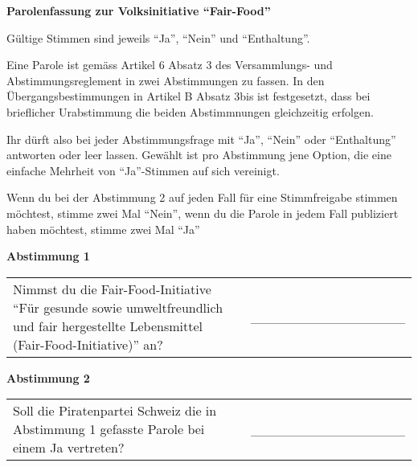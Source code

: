 \documentclass[11pt, a4paper]{scrartcl}
\begin{document}
{\begin{minipage}[t][12.5cm][t]{17.7cm}
\textbf{Parolenfassung zur Volksinitiative \enquote{Fair-Food}}

\vspace{0.2cm}
Gültige Stimmen sind jeweils \enquote{Ja}, \enquote{Nein} und \enquote{Enthaltung}.

\vspace{0.2cm}
Eine Parole ist gemäss Artikel 6 Absatz 3 des Versammlungs- und Abstimmungsreglement in zwei Abstimmungen zu fassen. In den Übergangsbestimmungen in Artikel B Absatz 3bis ist festgesetzt, dass bei brieflicher Urabstimmung die beiden Abstimmnungen gleichzeitig erfolgen.

\vspace{0.2cm}
Ihr dürft also bei jeder Abstimmungsfrage mit \enquote{Ja}, \enquote{Nein} oder \enquote{Enthaltung} antworten oder leer lassen. Gewählt ist pro Abstimmung jene Option, die eine einfache Mehrheit von \enquote{Ja}-Stimmen auf sich vereinigt. 

\vspace{0.2cm}
Wenn du bei der Abstimmung 2 auf jeden Fall für eine Stimmfreigabe stimmen möchtest, stimme zwei Mal \enquote{Nein}, wenn du die Parole in jedem Fall publiziert haben möchtest, stimme zwei Mal \enquote{Ja} %

\vspace{1cm}

\textbf{Abstimmung 1}

\vspace{0.5cm}

\begin{tabular}{ b{13.5cm} b{3cm} }
Nimmst du die Fair-Food-Initiative \enquote{Für gesunde sowie umweltfreundlich und fair hergestellte Lebensmittel (Fair-Food-Initiative)} an?
& \_\_\_\_\_\_\_\_\_\_\_\_\_\_\_\_ \\
\end{tabular}

\vspace{0.5cm}

\textbf{Abstimmung 2}

\vspace{0.5cm}

\begin{tabular}{ b{13.5cm} b{3cm} }
Soll die Piratenpartei Schweiz die in Abstimmung 1 gefasste Parole bei einem Ja vertreten?
& \_\_\_\_\_\_\_\_\_\_\_\_\_\_\_\_ \\
\end{tabular}


\end{minipage}}
\end{document}
